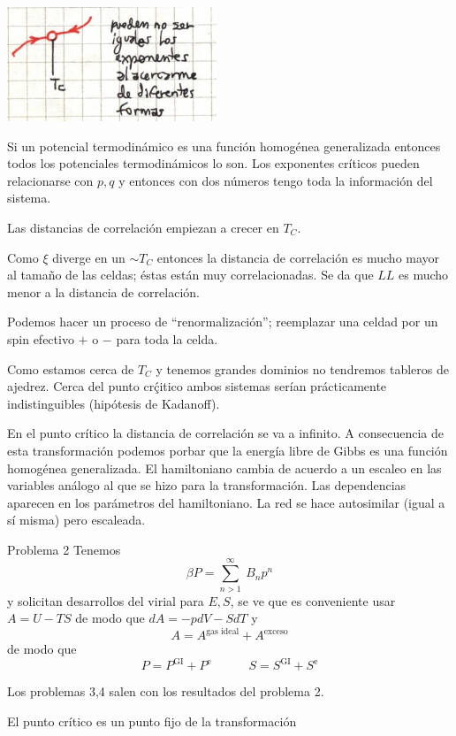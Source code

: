 \documentclass[10pt,oneside]{CBFT_book}
\begin{document}
\includegraphics[scale=0.4]{images/1606337124.jpg}

Si un potencial termodinámico es una función homogénea generalizada entonces todos los potenciales 
termodinámicos lo son.
Los exponentes críticos pueden relacionarse con $p,q$ y entonces con dos números tengo toda la información
del sistema.

Las distancias de correlación empiezan a crecer en $T_C$.

Como $\xi$ diverge en un $\sim T_C$ entonces la distancia de correlación es mucho mayor al tamaño de las
celdas; éstas están muy correlacionadas. Se da que $LL$ es mucho menor a la distancia de correlación.

Podemos hacer un proceso de ``renormalización''; reemplazar una celdad por un spin efectivo $+$ o $-$
para toda la celda.

Como estamos cerca de $T_C$ y tenemos grandes dominios no tendremos tableros de ajedrez.
Cerca del punto crḉitico ambos sistemas serían prácticamente indistinguibles (hipótesis de Kadanoff).

En el punto crítico la distancia de correlación se va a infinito. A consecuencia de esta transformación
podemos porbar que la energía libre de Gibbs es una función homogénea generalizada.
El hamiltoniano cambia de acuerdo a un escaleo en las variables análogo al que se hizo para la 
transformación.
Las dependencias aparecen en los parámetros del hamiltoniano.
La red se hace autosimilar (igual a sí misma) pero escaleada.

\begin{ejemplo}{Problema 2}
Tenemos
\[
	\beta P = \sum_{n> 1}^\infty \: B_n p^n
\]
y solicitan desarrollos del virial para $E,S$, se ve que es conveniente usar $A=U-TS$ de modo que
$dA = -p dV - S dT$ y 
\[
	A = A^\text{gas ideal} + A^\text{exceso}
\]
de modo que
\[
	P = P^\text{GI} + P^\text{e} \qquad \quad S = S^\text{GI} + S ^\text{e}
\]

Los problemas 3,4 salen con los resultados del problema 2.
\end{ejemplo}

El punto crítico es un punto fijo de la transformación
\end{document}
